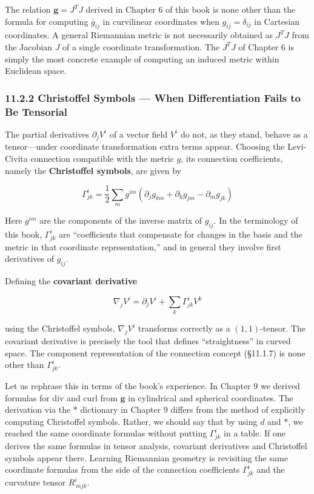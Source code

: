 \documentclass[a4paper,12pt,openany]{book}
\begin{document}
The relation \(\mathbf{g} = J^T J\) derived in Chapter 6 of this book is
none other than the formula for computing \(\bar{g}_{ij}\) in
curvilinear coordinates when \(g_{ij} = \delta_{ij}\) in Cartesian
coordinates. A general Riemannian metric is not necessarily obtained as
\(J^T J\) from the Jacobian \(J\) of a single coordinate transformation.
The \(J^T J\) of Chapter 6 is simply the most concrete example of
computing an induced metric within Euclidean space.

\hypertarget{christoffel-symbols-when-differentiation-fails-to-be-tensorial}{%
\subsubsection{11.2.2 Christoffel Symbols — When Differentiation Fails
to Be
Tensorial}\label{christoffel-symbols-when-differentiation-fails-to-be-tensorial}}

The partial derivatives \(\partial_j V^i\) of a vector field \(V^i\) do
not, as they stand, behave as a tensor—under coordinate transformation
extra terms appear. Choosing the Levi-Civita connection compatible with
the metric \(g\), its connection coefficients, namely the
\textbf{Christoffel symbols}, are given by

\[\Gamma^i_{jk} = \frac{1}{2}\sum_m g^{im}(\partial_j g_{km} + \partial_k g_{jm} - \partial_m g_{jk})\]

Here \(g^{im}\) are the components of the inverse matrix of \(g_{ij}\).
In the terminology of this book, \(\Gamma^i_{jk}\) are ``coefficients
that compensate for changes in the basis and the metric in that
coordinate representation,'' and in general they involve first
derivatives of \(g_{ij}\).

Defining the \textbf{covariant derivative}

\[\nabla_j V^i = \partial_j V^i + \sum_k \Gamma^i_{jk} V^k\]

using the Christoffel symbols, \(\nabla_j V^i\) transforms correctly as
a \((1,1)\)-tensor. The covariant derivative is precisely the tool that
defines ``straightness'' in curved space. The component representation
of the connection concept (§11.1.7) is none other than
\(\Gamma^i_{jk}\).

Let us rephrase this in terms of the book's experience. In Chapter 9 we
derived formulas for \(\mathrm{div}\) and \(\mathrm{curl}\) from
\(\mathbf{g}\) in cylindrical and spherical coordinates. The derivation
via the \(\ast\) dictionary in Chapter 9 differs from the method of
explicitly computing Christoffel symbols. Rather, we should say that by
using \(d\) and \(\ast\), we reached the same coordinate formulas
without putting \(\Gamma^i_{jk}\) in a table. If one derives the same
formulas in tensor analysis, covariant derivatives and Christoffel
symbols appear there. Learning Riemannian geometry is revisiting the
same coordinate formulas from the side of the connection coefficients
\(\Gamma^i_{jk}\) and the curvature tensor \(R^i_{\,mjk}\).
\end{document}
